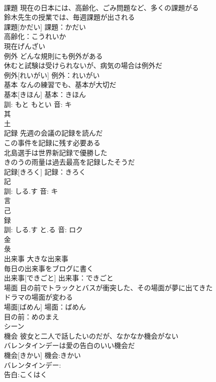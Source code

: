 \documentclass[8pt]{extreport}
\begin{document}
\begin{CJK}{UTF8}{min}
\\	課題	現在の日本には、高齢化、ごみ問題など、多くの課題がる 
\\	鈴木先生の授業では、毎週課題が出される 
\\	課題[かだい]			課題：かだい
\\	高齢化：こうれいか
\\	現在げんざい
\\	例外	どんな規則にも例外がある 
\\	休むと試験は受けられないが、病気の場合は例外だ 
\\	例外[れいがい]			例外：れいがい
\\	基本	なんの練習でも、基本が大切だ 
\\	基本[きほん]			基本：きほん
\\	訓: もと もとい 音: キ 
\\	其 
\\	土 
\\	記録	先週の会議の記録を読んだ 
\\	この事件を記録に残す必要ある 
\\	北島選手は世界新記録で優勝した 
\\	きのうの雨量は過去最高を記録したそうだ 
\\	記録[きろく]			記録：きろく
\\	記 
\\	訓: しる.す 音: キ 
\\	言 
\\	己 
\\	録 
\\	訓: しる.す と.る 音: ロク 
\\	金 
\\	彔 
\\	出来事	大きな出来事 
\\	毎日の出来事をブログに書く 
\\	出来事[できごと]			出来事：できごと
\\	場面	目の前でトラックとバスが衝突した、その場面が夢に出てきた 
\\	ドラマの場面が変わる 
\\	場面[ばめん]			場面：ばめん
\\	目の前：めのまえ
\\	シーン 
\\	機会	彼女と二人で話したいのだが、なかなか機会がない 
\\	バレンタインデーは愛の告白のいい機会だ 
\\	機会[きかい]			機会:きかい
\\	バレンタインデー:
\\	告白:こくはく

\end{CJK}
\end{document}
